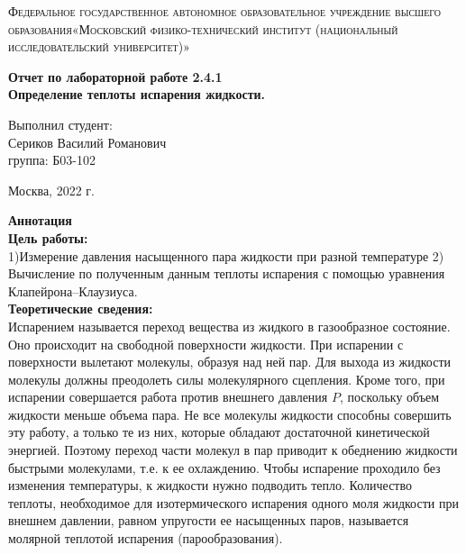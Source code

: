 \documentclass[a4paper, 12pt]{article}%
\begin{document}
	\begin{titlepage}
		\begin{center}
			\textsc{Федеральное государственное автономное образовательное учреждение высшего образования«Московский физико-технический институт (национальный исследовательский университет)»\\[5mm]
			}
			
			\vfill
			
			\textbf{Отчет по лабораторной работе 2.4.1 \\[3mm]
				Определение теплоты испарения жидкости.
				\\[50mm]
			}
			
		\end{center}
		
		\hfill
		\begin{minipage}{.5\textwidth}
			Выполнил студент:\\[2mm]
			Сериков Василий Романович\\[2mm]
			группа: Б03-102\\[5mm]
			
		\end{minipage}
		\vfill
		\begin{center}
			Москва, 2022 г.
		\end{center}
		
	\end{titlepage}
	
	\newpage
	\textbf{Аннотация}\\
	
	
	\textbf{Цель работы: }\\


     1)Измерение давления насыщенного пара жидкости при разной температуре 2) Вычисление по полученным данным теплоты испарения с помощью уравнения Клапейрона–Клаузиуса.\\
	
	
	\textbf{Теоретические сведения: } \\
	
	
	Испарением называется переход вещества из жидкого в газообразное состояние. Оно происходит на свободной поверхности жидкости. При испарении с поверхности вылетают молекулы, образуя над ней пар. Для выхода из жидкости молекулы должны преодолеть силы молекулярного сцепления. Кроме того, при испарении совершается работа против внешнего давления $ P $, поскольку объем жидкости меньше объема пара. Не все молекулы жидкости способны совершить эту работу, а только те из них, которые обладают достаточной кинетической энергией. Поэтому переход части молекул в пар приводит к обеднению жидкости быстрыми молекулами, т.е. к ее охлаждению. Чтобы испарение проходило без изменения температуры, к жидкости нужно подводить тепло. Количество теплоты, необходимое для изотермического испарения одного моля жидкости при внешнем давлении, равном упругости ее насыщенных паров, называется молярной теплотой испарения (парообразования).
	
\end{document}
